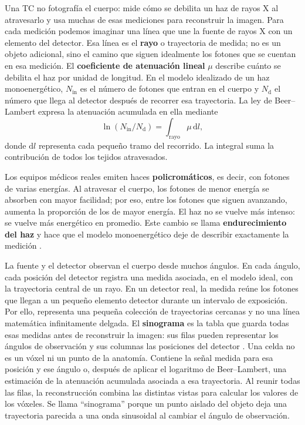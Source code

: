 Una TC no fotografía el cuerpo: mide cómo se debilita un haz de rayos X al atravesarlo y usa muchas de esas mediciones para reconstruir la imagen. Para cada medición podemos imaginar una línea que une la fuente de rayos X con un elemento del detector. Esa línea es el \textbf{rayo} o trayectoria de medida; no es un objeto adicional, sino el camino que siguen idealmente los fotones que se cuentan en esa medición. El \textbf{coeficiente de atenuación lineal} $\mu$ describe cuánto se debilita el haz por unidad de longitud. En el modelo idealizado de un haz monoenergético, $N_{\mathrm{in}}$ es el número de fotones que entran en el cuerpo y $N_{\mathrm{d}}$ el número que llega al detector después de recorrer esa trayectoria. La ley de Beer--Lambert expresa la atenuación acumulada en ella mediante
\[
\ln(N_{\mathrm{in}}/N_{\mathrm{d}})=\int_{\mathrm{rayo}}\mu\,\mathrm{d}l,
\]
 donde $\mathrm{d}l$ representa cada pequeño tramo del recorrido. La integral suma la contribución de todos los tejidos atravesados.

Los equipos médicos reales emiten haces \textbf{policromáticos}, es decir, con fotones de varias energías. Al atravesar el cuerpo, los fotones de menor energía se absorben con mayor facilidad; por eso, entre los fotones que siguen avanzando, aumenta la proporción de los de mayor energía. El haz no se vuelve más intenso: se vuelve más energético en promedio. Este cambio se llama \textbf{endurecimiento del haz} y hace que el modelo monoenergético deje de describir exactamente la medición \cite{kak2001book}.

La fuente y el detector observan el cuerpo desde muchos ángulos. En cada ángulo, cada posición del detector registra una medida asociada, en el modelo ideal, con la trayectoria central de un rayo. En un detector real, la medida reúne los fotones que llegan a un pequeño elemento detector durante un intervalo de exposición. Por ello, representa una pequeña colección de trayectorias cercanas y no una línea matemática infinitamente delgada. El \textbf{sinograma} es la tabla que guarda todas esas medidas antes de reconstruir la imagen: sus filas pueden representar los ángulos de observación y sus columnas las posiciones del detector \cite{deman2007catsim}. Una celda no es un vóxel ni un punto de la anatomía. Contiene la señal medida para esa posición y ese ángulo o, después de aplicar el logaritmo de Beer--Lambert, una estimación de la atenuación acumulada asociada a esa trayectoria. Al reunir todas las filas, la reconstrucción combina las distintas vistas para calcular los valores de los vóxeles. Se llama ``sinograma'' porque un punto aislado del objeto deja una trayectoria parecida a una onda sinusoidal al cambiar el ángulo de observación.

